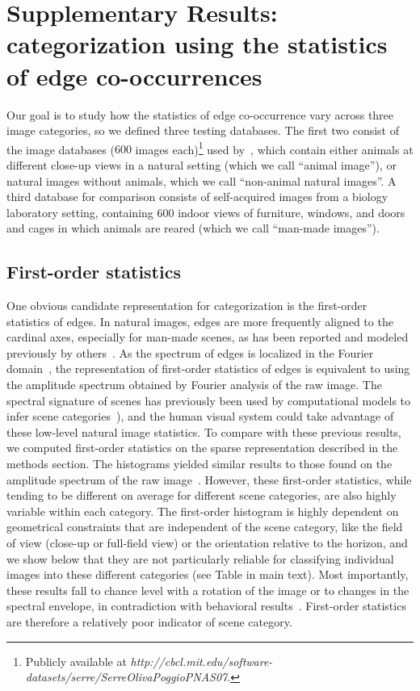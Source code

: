 \documentclass[a4paper]{article}
\begin{document}
\section{Supplementary Results: categorization using the statistics of edge co-occurrences}%
Our goal is to study how the statistics of edge co-occurrence vary across three image categories, 
so we defined three testing databases. 
The first two consist of the image databases ($600$ images each)\footnote{Publicly available at {\it http://cbcl.mit.edu/software-datasets/serre/SerreOlivaPoggioPNAS07}.} used by~\textcite{Serre07}, 
which contain either animals at different close-up views in a natural setting (which we call ``animal image''), 
or natural images without animals, which we call ``non-animal natural images''. 
A third database for comparison consists of self-acquired images from a biology laboratory setting, 
containing $600$ indoor views of furniture, windows, and doors and cages in which animals are reared (which we call ``man-made images'').  

\subsection{First-order statistics}

One obvious candidate representation for categorization is the first-order statistics of edges. 
In natural images, edges are more frequently aligned to the cardinal axes, 
especially for man-made scenes, as has been reported and modeled previously by others~\autocite{Girshick11}. 
As the spectrum of edges is localized in the Fourier domain~\autocite{Fischer07cv}, 
the representation of first-order statistics of edges is equivalent 
to using the amplitude spectrum obtained by Fourier analysis of the raw image. 
The spectral signature of scenes has previously been used by computational models 
to infer scene categories~\autocite{Oliva01,Torralba03}), 
and the human visual system could take advantage of these low-level natural image statistics. 
To compare with these previous results, 
we computed first-order statistics on the sparse representation described in the methods section. 
The histograms yielded similar results to those found 
on the amplitude spectrum of the raw image~\autocite{Oliva01,Torralba03}.
However, these first-order statistics, 
while tending to be different on average for different scene categories, 
are also highly variable within each category. 
The first-order histogram is highly dependent on geometrical constraints 
that are independent of the scene category, 
like the field of view (close-up or full-field view) 
or the orientation relative to the horizon, 
and we show below that they are not particularly reliable for 
classifying individual images into these different categories (see Table in main text). 
Most importantly, these results fall to chance level with 
a rotation of the image or to changes in the spectral envelope, 
in contradiction with behavioral results~\autocite{Crouzet11b,Gaspar09}.
First-order statistics are therefore a relatively poor indicator of scene category. 
\end{document}
